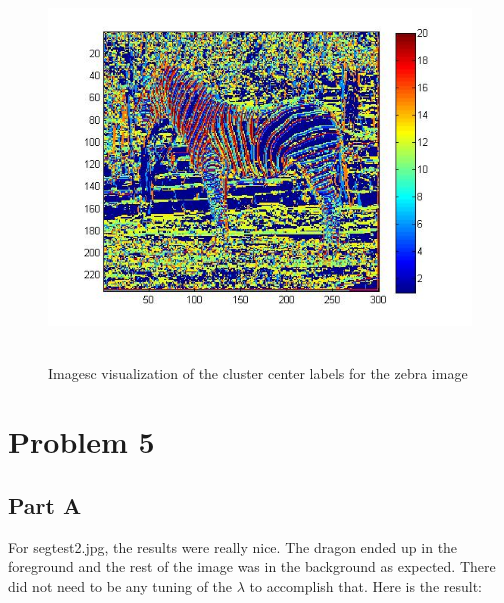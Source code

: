 \documentclass[11pt,psfig]{article}
\begin{document}
\begin{figure}[H]
\centering
\includegraphics[height=4in]{prob4plot.jpg}
\caption{Imagesc visualization of the cluster center labels for the zebra image}
\end{figure}

\newpage

\section*{Problem 5}

\subsection*{Part A}

For segtest2.jpg, the results were really nice. The dragon ended up in the foreground and the rest of the image was in the background as expected. There did not need to be any tuning of the $\lambda$ to accomplish that. Here is the result:
\end{document}
